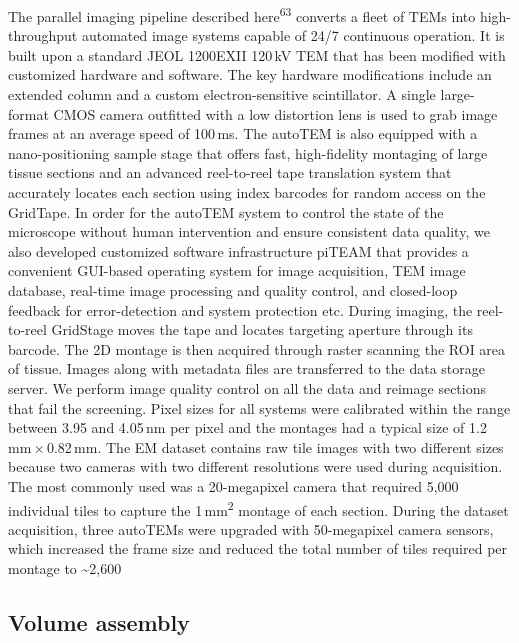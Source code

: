 \documentclass{article}
\begin{document}
The parallel imaging pipeline described here\textsuperscript{63} converts a fleet of TEMs into high-throughput automated image systems capable of 24/7 continuous operation. It is built upon a standard JEOL 1200EXII 120\,kV TEM that has been modified with customized hardware and software. The key hardware modifications include an extended column and a custom electron-sensitive scintillator. A single large-format CMOS camera outfitted with a low distortion lens is used to grab image frames at an average speed of 100\,ms. The autoTEM is also equipped with a nano-positioning sample stage that offers fast, high-fidelity montaging of large tissue sections and an advanced reel-to-reel tape translation system that accurately locates each section using index barcodes for random access on the GridTape. In order for the autoTEM system to control the state of the microscope without human intervention and ensure consistent data quality, we also developed customized software infrastructure piTEAM that provides a convenient GUI-based operating system for image acquisition, TEM image database, real-time image processing and quality control, and closed-loop feedback for error-detection and system protection etc. During imaging, the reel-to-reel GridStage moves the tape and locates targeting aperture through its barcode. The 2D montage is then acquired through raster scanning the ROI area of tissue. Images along with metadata files are transferred to the data storage server. We perform image quality control on all the data and reimage sections that fail the screening. Pixel sizes for all systems were calibrated within the range between 3.95 and 4.05\,nm per pixel and the montages had a typical size of 1.2\,mm\,×\,0.82\,mm. The EM dataset contains raw tile images with two different sizes because two cameras with two different resolutions were used during acquisition. The most commonly used was a 20-megapixel camera that required 5,000 individual tiles to capture the 1\,mm\textsuperscript{2} montage of each section. During the dataset acquisition, three autoTEMs were upgraded with 50-megapixel camera sensors, which increased the frame size and reduced the total number of tiles required per montage to \textasciitilde{}2,600

\subsection*{Volume assembly}
\end{document}

